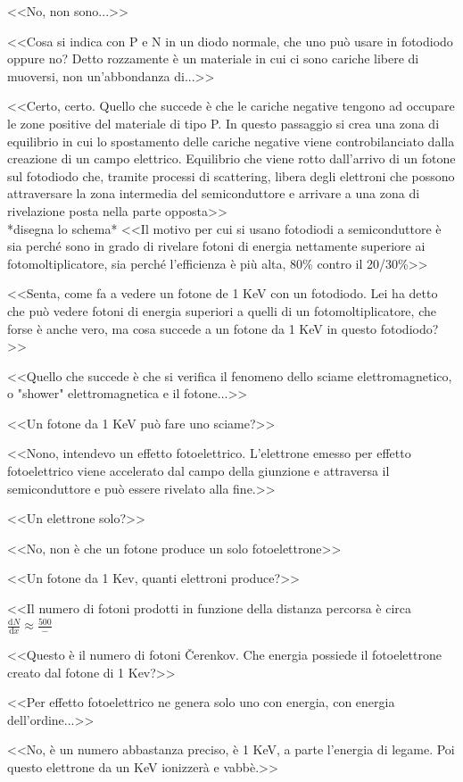 \documentclass[../main.tex]{subfiles}
\begin{document}
\begin{enumerate}
{        \begin{flushright}
        <<No, non sono...>>
        \end{flushright}
        <<Cosa si indica con P e N in un diodo normale, che uno può usare in fotodiodo oppure no? Detto rozzamente è un materiale in cui ci sono cariche libere di muoversi, non un'abbondanza di...>>
        \begin{flushright}
        <<Certo, certo. Quello che succede è che le cariche negative tengono ad occupare le zone positive del materiale di tipo P. In questo passaggio si crea una zona di equilibrio in cui lo spostamento delle cariche negative viene controbilanciato dalla creazione di un campo elettrico. Equilibrio che viene rotto dall'arrivo di un fotone sul fotodiodo che, tramite processi di scattering, libera degli elettroni che possono attraversare la zona intermedia del semiconduttore e arrivare a una zona di rivelazione posta nella parte opposta>>\\
        *disegna lo schema*
        <<Il motivo per cui si usano fotodiodi a semiconduttore è sia perché sono in grado di rivelare fotoni di energia nettamente superiore ai fotomoltiplicatore, sia perché l'efficienza è più alta, 80\% contro il 20/30\%>>
        \end{flushright}
        <<Senta, come fa a vedere un fotone de 1 KeV con un fotodiodo. Lei ha detto che può vedere fotoni di energia superiori a quelli di un fotomoltiplicatore, che forse è anche vero, ma cosa succede a un fotone da 1 KeV in questo fotodiodo?>>
        \begin{flushright}
        <<Quello che succede è che si verifica il fenomeno dello sciame elettromagnetico, o "shower" elettromagnetica e il fotone...>>
        \end{flushright}
        <<Un fotone da 1 KeV può fare uno sciame?>>
        \begin{flushright}
        <<Nono, intendevo un effetto fotoelettrico. L'elettrone emesso per effetto fotoelettrico viene accelerato dal campo della giunzione e attraversa il semiconduttore e può essere rivelato alla fine.>>
        \end{flushright}
        <<Un elettrone solo?>>
        \begin{flushright}
        <<No, non è che un fotone produce un solo fotoelettrone>>
        \end{flushright}
        <<Un fotone da 1 Kev, quanti elettroni produce?>>
        \begin{flushright}
        <<Il numero di fotoni prodotti in funzione della distanza percorsa è circa \(\frac{\textrm{d}N}{\textrm{d}x}\approx \frac{500}{-}\)
        \end{flushright}
        <<Questo è il numero di fotoni Čerenkov. Che energia possiede il fotoelettrone creato dal fotone di 1 Kev?>>
        \begin{flushright}
        <<Per effetto fotoelettrico ne genera solo uno con energia, con energia dell'ordine...>>
        \end{flushright}
        <<No, è un numero abbastanza preciso, è 1 KeV, a parte l'energia di legame. Poi questo elettrone da un KeV ionizzerà e vabbè.>>
        }
    \end{enumerate}
\end{document}
